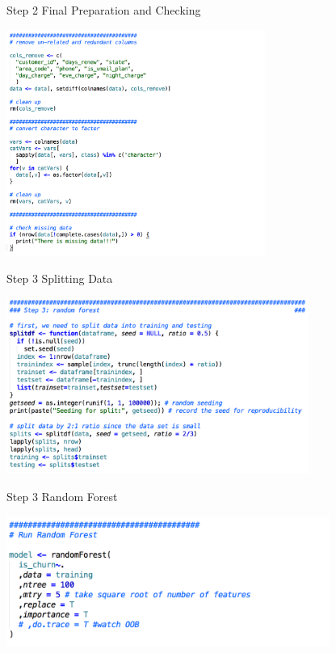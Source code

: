 \documentclass[10pt]{beamer}
\begin{document}
   \begin{frame}{Step 2 Final Preparation and Checking}
        \begin{center}
          \includegraphics[width=240pt]{../graphs/demo_r_step_2_3}
        \end{center}
    \end{frame}

    \begin{frame}{Step 3 Splitting Data}
        \begin{center}
          \includegraphics[width=280pt]{../graphs/demo_r_step_3}
        \end{center}
    \end{frame}

    \begin{frame}{Step 3 Random Forest}
        \begin{center}
          \includegraphics[width=300pt]{../graphs/demo_r_step_3_1}
        \end{center}
    \end{frame}
\end{document}
